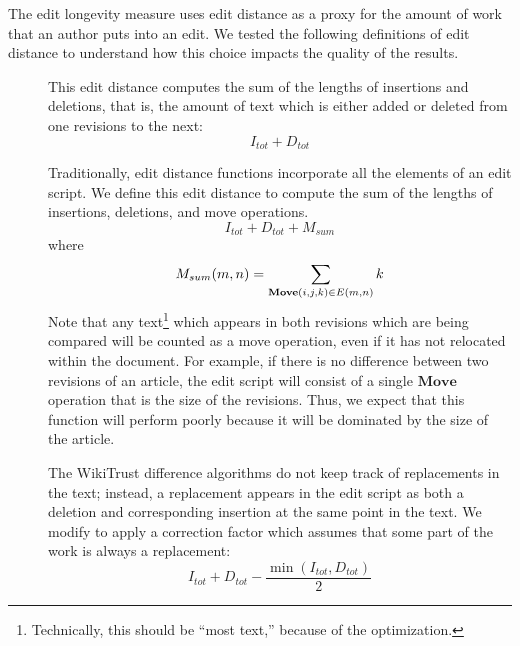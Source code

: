 The edit longevity measure uses edit distance as a proxy for the
amount of work that an author puts into an edit.
We tested the following definitions of edit distance to understand
how this choice impacts the quality of the results.
%
\begin{description}

\item[] This edit distance computes the sum of the lengths
    of insertions and deletions, that is, the amount of text which
    is either added or deleted from one revisions to the next:
    \begin{equation*}
    I_{tot} + D_{tot}
    \end{equation*}

\item[] Traditionally, edit distance functions incorporate
    all the elements of an edit script.  We define
    this edit distance to compute the sum of the lengths
    of insertions, deletions, and move operations.
    \begin{equation*}
    I_{tot} + D_{tot} + M_{sum}
    \end{equation*}
    where
    \begin{equation*}
    M_{sum}(m,n) = \sum_{\mathbf{Move}(i, j, k) \in E(m,n)} k \\
    \end{equation*}
    Note that any text\footnote{Technically, this should be ``most
    text,'' because of the  optimization.}
    which appears in both revisions which are being
    compared will be counted as a move operation, even if it has not
    relocated within the document.
    For example, if there is no difference between two revisions of
    an article, the edit script will consist of a single $\mathbf{Move}$
    operation that is the size of the revisions.
    Thus, we expect that this function will perform poorly because
    it will be dominated by the size of the article.

\item[]
    The WikiTrust difference algorithms do not keep track of replacements
    in the text; instead, a replacement appears in the edit script as
    both a deletion and corresponding insertion at the same point in the text.
    We modify  to apply a correction factor which
    assumes that some part of the work is always a replacement:
    \begin{equation*}
    I_{tot} + D_{tot} - \frac{\min(I_{tot}, D_{tot})}{2}
    \end{equation*}


\end{description}
